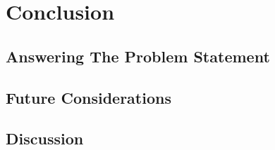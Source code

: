 \chapter{Conclusion}\label{ch:conclusion}

\section{Answering The Problem Statement}


\section{Future Considerations}


\section{Discussion}


